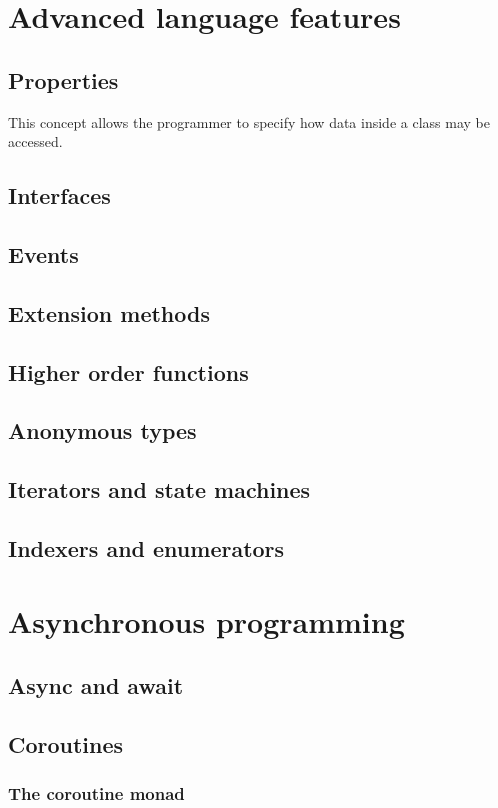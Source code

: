 \documentclass{article}
\begin{document}
\section{Advanced language features}
\subsection{Properties}
This concept allows the programmer to specify how data inside a class may be accessed.

\subsection{Interfaces}
\subsection{Events}
\subsection{Extension methods}
\subsection{Higher order functions}
\subsection{Anonymous types}
\subsection{Iterators and state machines}
\subsection{Indexers and enumerators}

\newpage

\section{Asynchronous programming}
\subsection{Async and await}
\subsection{Coroutines}
\subsubsection{The coroutine monad}
\end{document}
